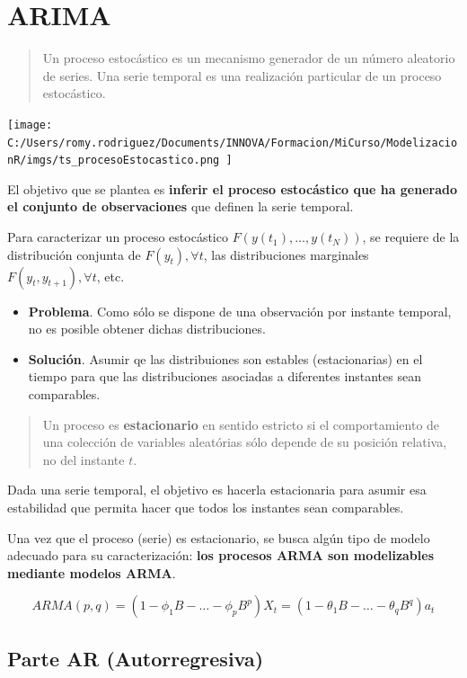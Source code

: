\documentclass[]{book}
\begin{document}
\hypertarget{arima}{%
\section{ARIMA}\label{arima}}

\begin{quote}
Un proceso estocástico es un mecanismo generador de un número aleatorio de series. Una serie temporal es una realización particular de un proceso estocástico.
\end{quote}

\texttt{[image: C:/Users/romy.rodriguez/Documents/INNOVA/Formacion/MiCurso/ModelizacionR/imgs/ts\_procesoEstocastico.png ]}

El objetivo que se plantea es \textbf{inferir el proceso estocástico que ha generado el conjunto de observaciones} que definen la serie temporal.

Para caracterizar un proceso estocástico \(F(y(t_1),\ldots,y(t_N))\), se requiere de la distribución conjunta de \(F(y_t), \forall t\), las distribuciones marginales \(F(y_t,y_{t+1}), \forall t\), etc.

\begin{itemize}
\item
  \textbf{Problema}. Como sólo se dispone de una observación por instante temporal, no es posible obtener dichas distribuciones.
\item
  \textbf{Solución}. Asumir qe las distribuiones son estables (estacionarias) en el tiempo para que las distribuciones asociadas a diferentes instantes sean comparables.
\end{itemize}

\begin{quote}
Un proceso es \textbf{estacionario} en sentido estricto si el comportamiento de una colección de variables aleatórias sólo depende de su posición relativa, no del instante \(t\).
\end{quote}

Dada una serie temporal, el objetivo es hacerla estacionaria para asumir esa estabilidad que permita hacer que todos los instantes sean comparables.

Una vez que el proceso (serie) es estacionario, se busca algún tipo de modelo adecuado para su caracterización: \textbf{los procesos ARMA son modelizables mediante modelos ARMA}.

\[ARMA(p,q) = (1-\phi_1 B - \ldots - \phi_p B^p)X_t = (1- \theta_1 B - \ldots - \theta_q B^q)a_t\]

\hypertarget{parte-ar-autorregresiva}{%
\subsection{Parte AR (Autorregresiva)}\label{parte-ar-autorregresiva}}
\end{document}
